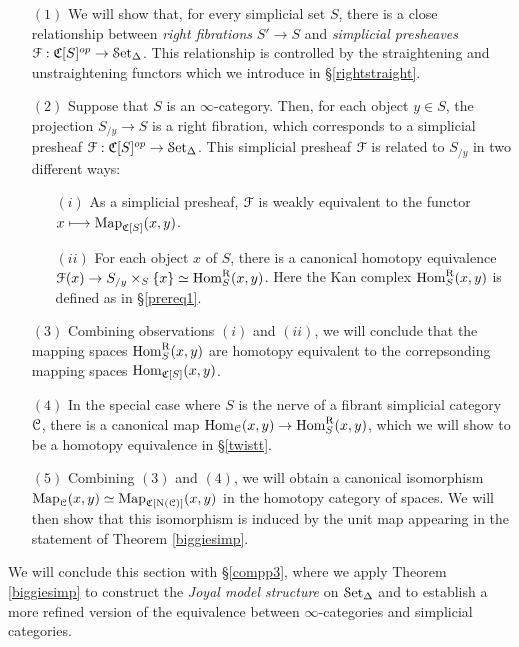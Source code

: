 \begin{itemize}
\item[$(1)$] We will show that, for every simplicial set $S$, there is a close relationship between
{\it right fibrations} $S' \rightarrow S$ and {\it simplicial presheaves} $\operatorname{\mathcal{F}}: \operatorname{\mathfrak{C}}[S]^{op} \rightarrow \operatorname{\mathcal{S}et_{\Delta}}$. This relationship is controlled by the straightening and unstraightening
functors which we introduce in \S \ref{rightstraight}.
\item[$(2)$] Suppose that $S$ is an $\infty$-category. Then, for each object
$y \in S$, the projection $S_{/y} \rightarrow S$ is a right fibration, which corresponds to a simplicial presheaf $\operatorname{\mathcal{F}}: \operatorname{\mathfrak{C}}[S]^{op} \rightarrow \operatorname{\mathcal{S}et_{\Delta}}$. This simplicial presheaf
$\operatorname{\mathcal{F}}$ is related to $S_{/y}$ in two different ways:
\begin{itemize}
\item[$(i)$] As a simplicial presheaf, $\operatorname{\mathcal{F}}$ is weakly equivalent to the functor
$x \longmapsto \operatorname{{Map}}_{ \operatorname{\mathfrak{C}}[S]}(x,y)$.
\item[$(ii)$] For each object $x$ of $S$, there is a canonical homotopy equivalence
$\operatorname{\mathcal{F}}(x) \rightarrow S_{/y} \times_{S} \{x\} \simeq \operatorname{Hom}_{S}^{\operatorname{R}}(x,y)$.
Here the Kan complex $\operatorname{Hom}_{S}^{\operatorname{R}}(x,y)$ is defined as in \S \ref{prereq1}.
\end{itemize}
\item[$(3)$] Combining observations $(i)$ and $(ii)$, we will conclude that
the mapping spaces $\operatorname{Hom}_{S}^{\operatorname{R}}(x,y)$ are homotopy equivalent to the correpsonding
mapping spaces $\operatorname{Hom}_{\operatorname{\mathfrak{C}}[S]}(x,y)$.
\item[$(4)$] In the special case where $S$ is the nerve of a fibrant simplicial category $\operatorname{\mathcal{C}}$,
there is a canonical map $\operatorname{Hom}_{\operatorname{\mathcal{C}}}(x,y) \rightarrow \operatorname{Hom}_{S}^{\operatorname{R}}(x,y)$, which we will
show to be a homotopy equivalence in \S \ref{twistt}.
\item[$(5)$] Combining $(3)$ and $(4)$, we will obtain a canonical isomorphism
$\operatorname{{Map}}_{\operatorname{\mathcal{C}}}(x,y) \simeq \operatorname{{Map}}_{ \operatorname{\mathfrak{C}}[ \operatorname{N}(\operatorname{\mathcal{C}}) ] }(x,y)$ in the homotopy category of spaces. We will then show that this isomorphism is induced by the unit map appearing in the statement of Theorem \ref{biggiesimp}.
\end{itemize}

We will conclude this section with \S \ref{compp3}, where we apply Theorem \ref{biggiesimp} to 
construct the {\it Joyal model structure} on $\operatorname{\mathcal{S}et_{\Delta}}$ and to establish a more refined version of the equivalence between $\infty$-categories and simplicial categories. 

